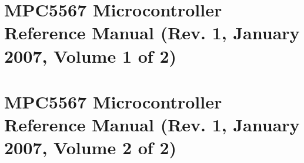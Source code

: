 \hypertarget{mpc55xx_ext_doc_mpc55xx_ext_doc_mpc5567rm_1}{}\section{M\+P\+C5567 Microcontroller Reference Manual (\+Rev. 1, January 2007, Volume 1 of 2)}\label{mpc55xx_ext_doc_mpc55xx_ext_doc_mpc5567rm_1}
\hypertarget{mpc55xx_ext_doc_mpc55xx_ext_doc_mpc5567rm_2}{}\section{M\+P\+C5567 Microcontroller Reference Manual (\+Rev. 1, January 2007, Volume 2 of 2)}\label{mpc55xx_ext_doc_mpc55xx_ext_doc_mpc5567rm_2}
